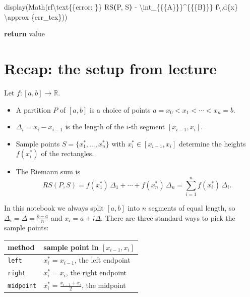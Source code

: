 \documentclass[
  letterpaper,
  DIV=11,
  numbers=noendperiod]{scrreprt}
\newenvironment{Shaded}{\begin{snugshade}}{\end{snugshade}}
\newcommand{\CharTok}[1]{\textcolor[rgb]{0.13,0.47,0.30}{#1}}
\newcommand{\ControlFlowTok}[1]{\textcolor[rgb]{0.00,0.23,0.31}{\textbf{#1}}}
\newcommand{\DecValTok}[1]{\textcolor[rgb]{0.68,0.00,0.00}{#1}}
\newcommand{\ErrorTok}[1]{\textcolor[rgb]{0.68,0.00,0.00}{#1}}
\newcommand{\KeywordTok}[1]{\textcolor[rgb]{0.00,0.23,0.31}{\textbf{#1}}}
\newcommand{\NormalTok}[1]{\textcolor[rgb]{0.00,0.23,0.31}{#1}}
\newcommand{\SpecialCharTok}[1]{\textcolor[rgb]{0.37,0.37,0.37}{#1}}
\newcommand{\VerbatimStringTok}[1]{\textcolor[rgb]{0.13,0.47,0.30}{#1}}
\newcounter{none} %
\providecommand{\tightlist}{%
  \setlength{\itemsep}{0pt}\setlength{\parskip}{0pt}}
\theoremstyle{plain}
\theoremstyle{plain}
\theoremstyle{definition}
\theoremstyle{definition}
\theoremstyle{definition}
\theoremstyle{plain}
\theoremstyle{plain}
\theoremstyle{remark}
\begin{document}
\begin{Shaded}
\begin{Highlighting}[]
\NormalTok{        display(Math(}\VerbatimStringTok{rf\textquotesingle{}}\CharTok{\textbackslash{}t}\VerbatimStringTok{ext}\CharTok{\{\{}\VerbatimStringTok{error: }\CharTok{\}\}}\VerbatimStringTok{ RS}\KeywordTok{(}\VerbatimStringTok{P, S}\KeywordTok{)}\VerbatimStringTok{ {-} }\ErrorTok{\textbackslash{}}\VerbatimStringTok{int\_}\CharTok{\{\{}\SpecialCharTok{\{}\NormalTok{A}\SpecialCharTok{\}}\CharTok{\}\}}\DecValTok{\^{}}\CharTok{\{\{}\SpecialCharTok{\{}\NormalTok{B}\SpecialCharTok{\}}\CharTok{\}\}}\VerbatimStringTok{ f}\CharTok{\textbackslash{},}\VerbatimStringTok{d}\SpecialCharTok{\{}\NormalTok{x}\SpecialCharTok{\}}\VerbatimStringTok{ }\CharTok{\textbackslash{}a}\VerbatimStringTok{pprox }\SpecialCharTok{\{}\NormalTok{err\_tex}\SpecialCharTok{\}}\VerbatimStringTok{\textquotesingle{}}\NormalTok{))}

    \ControlFlowTok{return}\NormalTok{ value}
\end{Highlighting}
\end{Shaded}

\section{Recap: the setup from
lecture}\label{recap-the-setup-from-lecture}

Let \(f : [a,b] \to \mathbb{R}\).

\begin{itemize}
\tightlist
\item
  A partition \(P\) of \([a,b]\) is a choice of points
  \(a = x_0 < x_1 < \cdots < x_n = b\).
\item
  \(\Delta_i = x_i - x_{i-1}\) is the length of the \(i\)-th segment
  \([x_{i-1}, x_i]\).
\item
  Sample points \(S = \{x_1^*, \ldots, x_n^*\}\) with
  \(x_i^* \in [x_{i-1}, x_i]\) determine the heights \(f(x_i^*)\) of the
  rectangles.
\item
  The Riemann sum is
  \[RS(P,S) = f(x_1^*)\,\Delta_1 + \cdots + f(x_n^*)\,\Delta_n = \sum_{i=1}^n f(x_i^*)\,\Delta_i.\]
\end{itemize}

In this notebook we always split \([a,b]\) into \(n\) segments of equal
length, so \(\Delta_i = \Delta = \frac{b-a}{n}\) and
\(x_i = a + i\Delta\). There are three standard ways to pick the sample
points:

{\def\LTcaptype{none} %
\begin{longtable}[]{@{}ll@{}}
\toprule\noalign{}
method & sample point in \([x_{i-1}, x_i]\) \\
\midrule\noalign{}
\endhead
\bottomrule\noalign{}
\endlastfoot
\texttt{\textquotesingle{}left\textquotesingle{}} & \(x_i^* = x_{i-1}\),
the left endpoint \\
\texttt{\textquotesingle{}right\textquotesingle{}} & \(x_i^* = x_i\),
the right endpoint \\
\texttt{\textquotesingle{}midpoint\textquotesingle{}} &
\(x_i^* = \frac{x_{i-1}+x_i}{2}\), the midpoint \\
\end{longtable}
}
\end{document}
